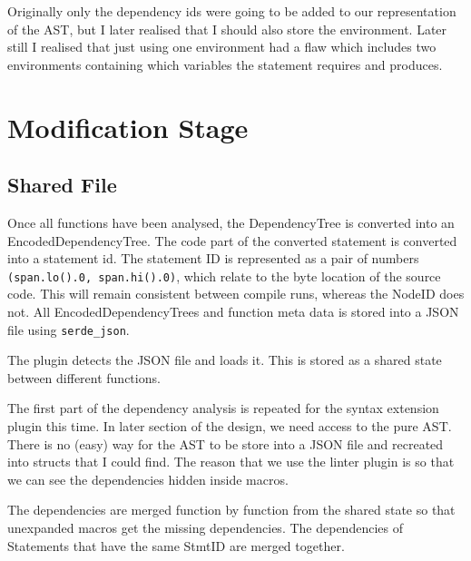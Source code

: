  Originally only the dependency ids were going to be added to our representation of the AST, but I later realised that I should also store the environment. Later still I realised that just using one environment had a flaw which includes two environments containing which variables the statement requires and produces.

\section{Modification Stage}
\subsection{Shared File}

Once all functions have been analysed, the DependencyTree is converted into an EncodedDependencyTree. The code part of the converted statement is converted into a statement id. The statement ID is represented as a pair of numbers \texttt{(span.lo().0, span.hi().0)}, which relate to the byte location of the source code. This will remain consistent between compile runs, whereas the NodeID does not. All EncodedDependencyTrees and function meta data is stored into a JSON file using \texttt{serde\_json}.

The plugin detects the JSON file and loads it. This is stored as a shared state between different functions.

The first part of the dependency analysis is repeated for the syntax extension plugin this time. In later section of the design, we need access to the pure AST. There is no (easy) way for the AST to be store into a JSON file and recreated into structs that I could find. The reason that we use the linter plugin is so that we can see the dependencies hidden inside macros.

The dependencies are merged function by function from the shared state so that unexpanded macros get the missing dependencies. The dependencies of Statements that have the same StmtID are merged together.



